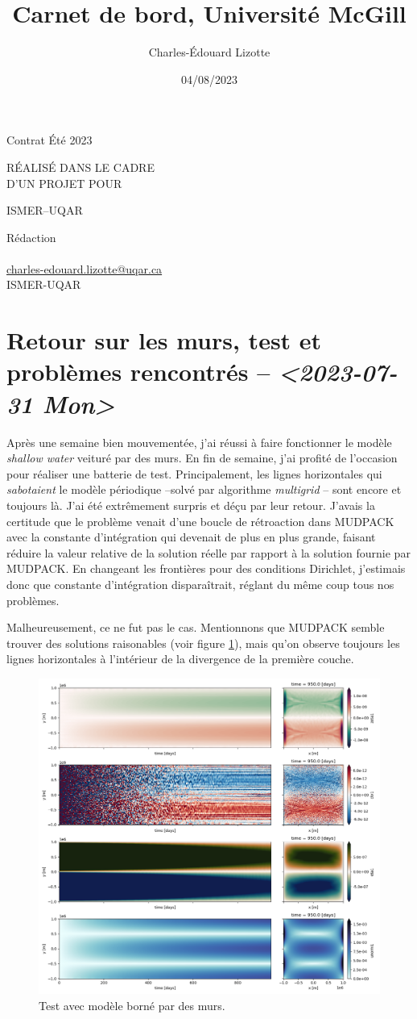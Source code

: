 \documentclass[10pt]{article}
\author{Charles-Édouard Lizotte}
\date{04/08/2023}
\title{Carnet de bord, Université McGill}
\makeatletter
\numberwithin{equation}{section}
\newcommand{\mytitlepage}{
\begin{titlepage}
\begin{center}
{\Large Contrat Été 2023 \par}
\vspace{2cm}
{\Large \MakeUppercase{\thetitle} \par}
\vspace{2cm}
RÉALISÉ DANS LE CADRE\\ D'UN PROJET POUR \par
\vspace{2cm}
{\Large ISMER--UQAR \par}
\vspace{2cm}
{\thedate}
\end{center}
\vfill
Rédaction \\
{\theauthor}\\
\url{charles-edouard.lizotte@uqar.ca}\\
ISMER-UQAR
\end{titlepage}
}
\makeatother
\begin{document}
\mytitlepage
\tableofcontents\newpage


\section{Retour sur les murs, test et problèmes rencontrés -- \textit{<2023-07-31 Mon>}}
\label{sec:org8b01f6b}

Après une semaine bien mouvementée, j'ai réussi à faire fonctionner le modèle \emph{shallow water} veituré par des murs.
En fin de semaine, j'ai profité de l'occasion pour réaliser une batterie de test.
Principalement, les lignes horizontales qui \emph{sabotaient} le modèle périodique --solvé par algorithme \emph{multigrid} -- sont encore et toujours là.
J'ai été extrêmement surpris et déçu par leur retour.
J'avais la certitude que le problème venait d'une boucle de rétroaction dans MUDPACK avec la constante d'intégration qui devenait de plus en plus grande, faisant réduire la valeur relative de la solution réelle par rapport à la solution fournie par MUDPACK.
En changeant les frontières pour des conditions Dirichlet, j'estimais donc que constante d'intégration disparaîtrait, réglant du même coup tous nos problèmes.\bigskip

Malheureusement, ce ne fut pas le cas.
Mentionnons que MUDPACK semble trouver des solutions raisonables (voir figure \ref{fig:org41c941f}), mais qu'on observe toujours les lignes horizontales à l'intérieur de la divergence de la première couche.

\begin{figure}[htbp]
\centering
\includegraphics[width=.9\linewidth]{figures/tests/2023-07-31_hovmoller1_t=950days.png}
\caption{\label{fig:org41c941f}Test avec modèle borné par des murs.}
\end{figure}
\newpage
\end{document}
